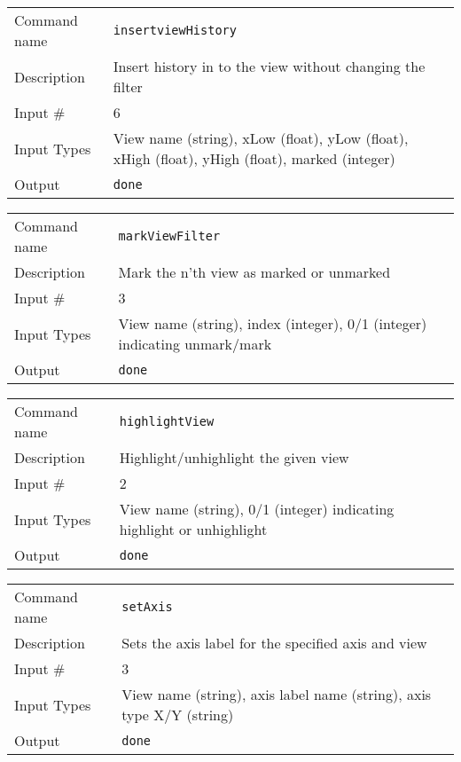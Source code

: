 \bigskip

\noindent
\begin{tabular}{l|p{5in}}
\hline
Command name & {\tt insertviewHistory} \\
Description  & Insert history in to the view without changing the filter \\
Input \#     & 6 \\
Input Types  & View name (string), xLow (float), yLow (float), xHigh (float),
               yHigh (float), marked (integer) \\
Output       & {\tt done} \\
\hline
\end{tabular}

\bigskip

\noindent
\begin{tabular}{l|p{5in}}
\hline
Command name & {\tt markViewFilter} \\
Description  & Mark the n'th view as marked or unmarked \\
Input \#     & 3 \\
Input Types  & View name (string), index (integer),
               0/1 (integer) indicating unmark/mark \\
Output       & {\tt done} \\
\hline
\end{tabular}

\bigskip

\noindent
\begin{tabular}{l|p{5in}}
\hline
Command name & {\tt highlightView} \\
Description  & Highlight/unhighlight the given view \\
Input \#     & 2 \\
Input Types  & View name (string), 0/1 (integer) indicating highlight
               or unhighlight \\
Output       & {\tt done} \\
\hline
\end{tabular}

\bigskip

\noindent
\begin{tabular}{l|p{5in}}
\hline
Command name & {\tt setAxis} \\
Description  & Sets the axis label for the specified axis and view \\
Input \#     & 3 \\
Input Types  & View name (string), axis label name (string),
               axis type X/Y (string) \\
Output       & {\tt done} \\
\hline
\end{tabular}

